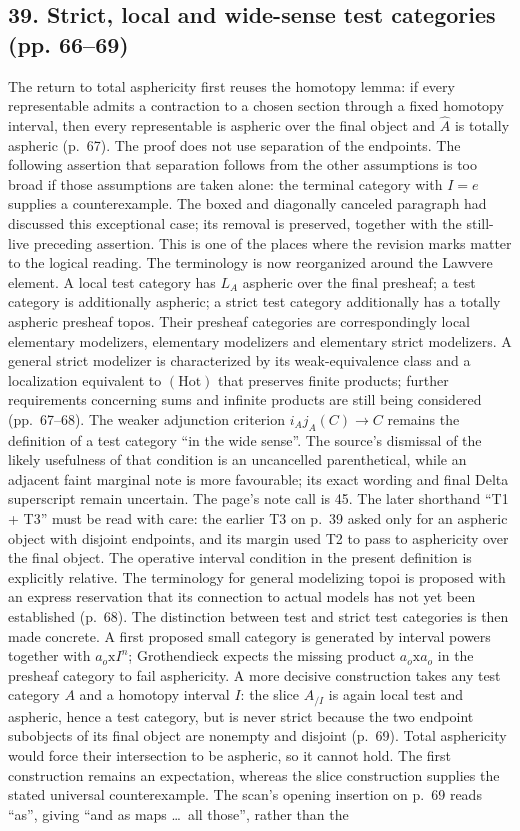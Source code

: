 \documentclass[10pt,oneside]{book}
\begin{document}
\subsection*{39. Strict, local and wide-sense test categories (pp. 66--69)}
The return to total asphericity first reuses the homotopy lemma: if every representable admits a contraction to a chosen section through a fixed homotopy interval, then every representable is aspheric over the final object and $\widehat A$ is totally aspheric (p.~67). The proof does not use separation of the endpoints. The following assertion that separation follows from the other assumptions is too broad if those assumptions are taken alone: the terminal category with $I=e$ supplies a counterexample. The boxed and diagonally canceled paragraph had discussed this exceptional case; its removal is preserved, together with the still-live preceding assertion. This is one of the places where the revision marks matter to the logical reading. The terminology is now reorganized around the Lawvere element. A local test category has $L_A$ aspheric over the final presheaf; a test category is additionally aspheric; a strict test category additionally has a totally aspheric presheaf topos. Their presheaf categories are correspondingly local elementary modelizers, elementary modelizers and elementary strict modelizers. A general strict modelizer is characterized by its weak-equivalence class and a localization equivalent to $(\mathrm{Hot})$ that preserves finite products; further requirements concerning sums and infinite products are still being considered (pp.~67--68). The weaker adjunction criterion $i_Aj_A(C)\to C$ remains the definition of a test category ``in the wide sense''. The source's dismissal of the likely usefulness of that condition is an uncancelled parenthetical, while an adjacent faint marginal note is more favourable; its exact wording and final Delta superscript remain uncertain. The page's note call is 45. The later shorthand ``T1 + T3'' must be read with care: the earlier T3 on p.~39 asked only for an aspheric object with disjoint endpoints, and its margin used T2 to pass to asphericity over the final object. The operative interval condition in the present definition is explicitly relative. The terminology for general modelizing topoi is proposed with an express reservation that its connection to actual models has not yet been established (p.~68). The distinction between test and strict test categories is then made concrete. A first proposed small category is generated by interval powers together with $a_o\mathrm{x}I^n$; Grothendieck expects the missing product $a_o\mathrm{x}a_o$ in the presheaf category to fail asphericity. A more decisive construction takes any test category $A$ and a homotopy interval $I$: the slice $A_{/I}$ is again local test and aspheric, hence a test category, but is never strict because the two endpoint subobjects of its final object are nonempty and disjoint (p.~69). Total asphericity would force their intersection to be aspheric, so it cannot hold. The first construction remains an expectation, whereas the slice construction supplies the stated universal counterexample. The scan's opening insertion on p.~69 reads ``as'', giving ``and as maps \ldots\ all those'', rather than the 
\end{document}
